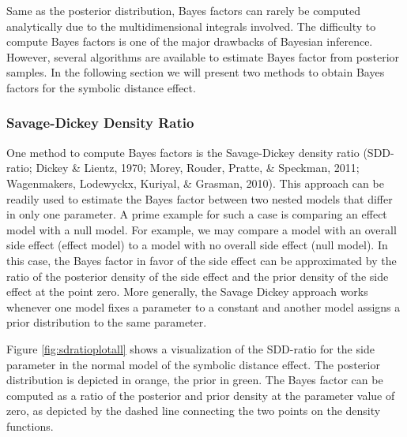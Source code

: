 \documentclass[
  english,
  doc,floatsintext]{apa6}
\begin{document}
Same as the posterior distribution, Bayes factors can rarely be computed analytically due to the multidimensional integrals involved. The difficulty to compute Bayes factors is one of the major drawbacks of Bayesian inference. However, several algorithms are available to estimate Bayes factor from posterior samples. In the following section we will present two methods to obtain Bayes factors for the symbolic distance effect.

\hypertarget{savage-dickey-density-ratio}{%
\subsubsection{Savage-Dickey Density Ratio}\label{savage-dickey-density-ratio}}

One method to compute Bayes factors is the Savage-Dickey density ratio (SDD-ratio; Dickey \& Lientz, 1970; Morey, Rouder, Pratte, \& Speckman, 2011; Wagenmakers, Lodewyckx, Kuriyal, \& Grasman, 2010). This approach can be readily used to estimate the Bayes factor between two nested models that differ in only one parameter. A prime example for such a case is comparing an effect model with a null model. For example, we may compare a model with an overall side effect (effect model) to a model with no overall side effect (null model). In this case, the Bayes factor in favor of the side effect can be approximated by the ratio of the posterior density of the side effect and the prior density of the side effect at the point zero. More generally, the Savage Dickey approach works whenever one model fixes a parameter to a constant and another model assigns a prior distribution to the same parameter.

Figure \ref{fig:sdratioplotall} shows a visualization of the SDD-ratio for the side parameter in the normal model of the symbolic distance effect. The posterior distribution is depicted in orange, the prior in green. The Bayes factor can be computed as a ratio of the posterior and prior density at the parameter value of zero, as depicted by the dashed line connecting the two points on the density functions.
\end{document}
